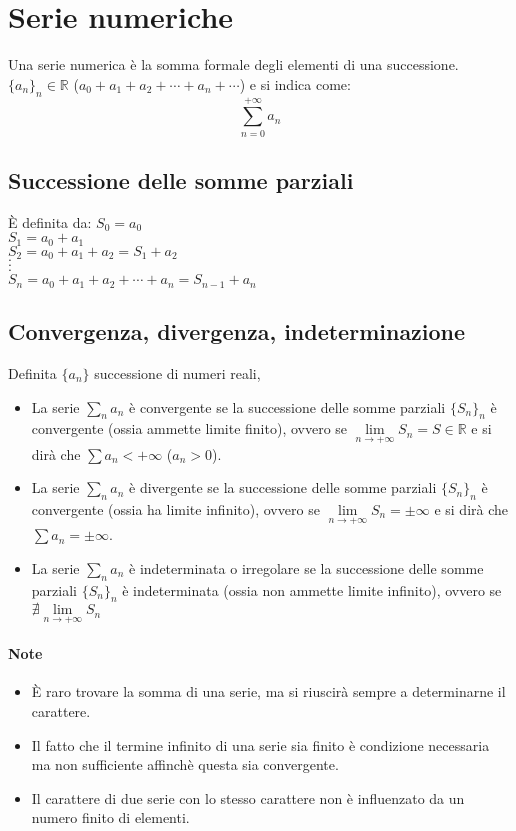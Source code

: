 \chapter{Serie numeriche}
Una serie numerica \`e la somma formale degli elementi di una successione. $\{a_n\}_n\in\mathbb{R}$ ($a_0+a_1+a_2+\cdots+a_n+\cdots$) e si indica come:
\begin{equation}
\sum\limits_{n=0}^{+\infty}a_n
\end{equation}
\section{Successione delle somme parziali}
\`E definita da:
$S_0=a_0$\\
$S_1=a_0+a_1$\\
$S_2=a_0+a_1+a_2=S_1+a_2$\\
$\cdot$\\
$\cdot$\\
$\cdot$\\
$S_n=a_0+a_1+a_2+\cdots+a_n=S_{n-1}+a_n$
\section{Convergenza, divergenza, indeterminazione}
Definita $\{a_n\}$ successione di numeri reali,
\begin{itemize}
\item La serie $\sum\limits_n a_n$ \`e convergente se la successione delle somme parziali $\{S_n\}_n$ \`e convergente (ossia ammette limite finito), ovvero se $\lim\limits_{n\rightarrow+
\infty}S_n=S\in\mathbb{R}$ e si dir\`a che $\sum a_n<+\infty$ ($a_n>0$).
\item La serie $\sum\limits_n a_n$ \`e divergente se la successione delle somme parziali $\{S_n\}_n$ \`e convergente (ossia ha limite infinito), ovvero se $\lim\limits_{n\rightarrow+
\infty}S_n=\pm\infty$ e si dir\`a che $\sum a_n=\pm\infty$.
\item La serie $\sum\limits_n a_n$ \`e indeterminata o irregolare se la successione delle somme parziali $\{S_n\}_n$ \`e indeterminata (ossia non ammette limite infinito), ovvero se $\nexists\lim\limits_{n\rightarrow+\infty}S_n$
\end{itemize}
\subsubsection{Note}
\begin{itemize}
\item \`E raro trovare la somma di una serie, ma si riuscir\`a sempre a determinarne il carattere.
\item Il fatto che il termine infinito di una serie sia finito \`e condizione necessaria ma non sufficiente affinch\`e questa sia convergente.
\item Il carattere di due serie con lo stesso carattere non \`e influenzato da un numero finito di elementi.
\end{itemize}
